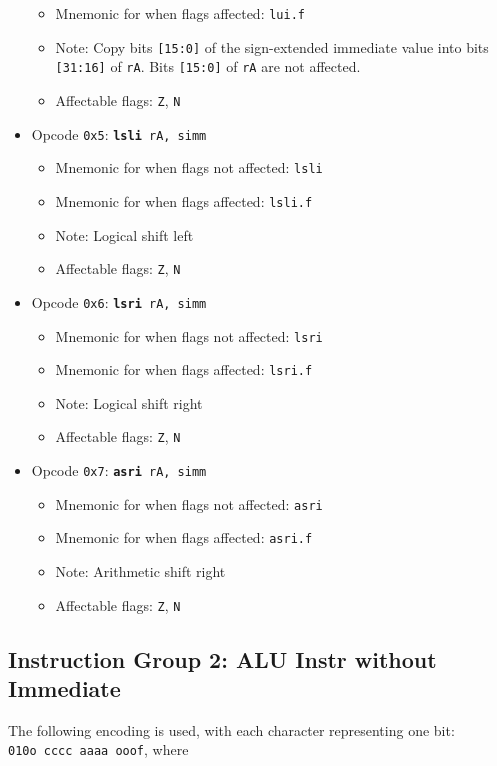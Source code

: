 \documentclass{article}
\begin{document}
\begin{itemize}
\begin{itemize}
			\item Mnemonic for when flags affected:  \texttt{lui.f}
			\item Note:  Copy bits \texttt{[15:0]} of the sign-extended
			immediate value into bits \texttt{[31:16]} of \texttt{rA}.
			Bits \texttt{[15:0]} of \texttt{rA} are not affected.
			\item Affectable flags:
				\texttt{Z}, \texttt{N}
		\end{itemize}
		\item Opcode \texttt{0x5}:
			\texttt{\textbf{lsli} rA, simm}
		\begin{itemize}
			\item Mnemonic for when flags not affected:  \texttt{lsli}
			\item Mnemonic for when flags affected:  \texttt{lsli.f}
			\item Note:  Logical shift left
			\item Affectable flags:
				\texttt{Z}, \texttt{N}
		\end{itemize}
		\item Opcode \texttt{0x6}:
			\texttt{\textbf{lsri} rA, simm}
		\begin{itemize}
			\item Mnemonic for when flags not affected:  \texttt{lsri}
			\item Mnemonic for when flags affected:  \texttt{lsri.f}
			\item Note:  Logical shift right
			\item Affectable flags:
				\texttt{Z}, \texttt{N}
		\end{itemize}
		\item Opcode \texttt{0x7}:
			\texttt{\textbf{asri} rA, simm}
		\begin{itemize}
			\item Mnemonic for when flags not affected:  \texttt{asri}
			\item Mnemonic for when flags affected:  \texttt{asri.f}
			\item Note:  Arithmetic shift right
			\item Affectable flags:
				\texttt{Z}, \texttt{N}
		\end{itemize}
	\end{itemize}

	\doublespacing

	\subsection{Instruction Group 2:  ALU Instr without Immediate}
	The following encoding is used, with each character representing one
	bit:  \\
	\texttt{010o cccc aaaa ooof}, where
\end{document}
